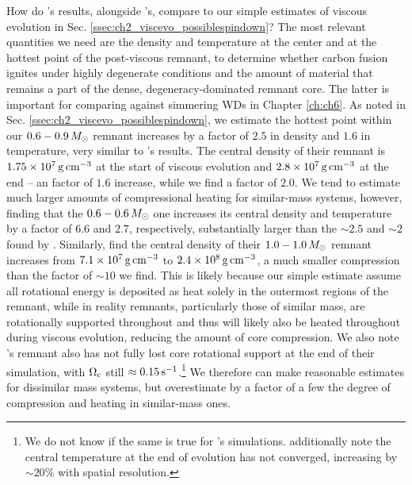 How do \cite{ji+13}'s results, alongside \cite{schw+12}'s, compare to our simple estimates of viscous evolution in Sec. \ref{ssec:ch2_viscevo_possiblespindown}?  The most relevant quantities we need are the density and temperature at the center and at the hottest point of the post-viscous remnant, to determine whether carbon fusion ignites under highly degenerate conditions and the amount of material that remains a part of the dense, degeneracy-dominated remnant core.  The latter is important for comparing against simmering WDs in Chapter \ref{ch:ch6}.  As noted in Sec. \ref{ssec:ch2_viscevo_possiblespindown}, we estimate the hottest point within our $0.6-0.9\,\Msun$ remnant increases by a factor of $2.5$ in density and $1.6$ in temperature, very similar to \cite{schw+12}'s results.  The central density of their remnant is $1.75\times10^7\,\gcc$ at the start of viscous evolution \citep{dan+11} and $2.8\times10^7\,\gcc$ at the end -- an factor of $1.6$ increase, while we find a factor of $2.0$.  We tend to estimate much larger amounts of compressional heating for similar-mass systems, however, finding that the $0.6 - 0.6\,\Msun$ one increases its central density and temperature by a factor of $6.6$ and $2.7$, respectively, substantially larger than the $\sim2.5$ and $\sim2$ found by \cite{ji+13}.  Similarly, \cite{rask+14} find the central density of their $1.0-1.0\,\Msun$ remnant increases from $7.1\times10^7\,\gcc$ to $2.4\times10^8\,\gcc$, a much smaller compression than the factor of $\sim10$ we find.  This is likely because our simple estimate assume all rotational energy is deposited as heat solely in the outermost regions of the remnant, while in reality remnants, particularly those of similar mass, are rotationally supported throughout and thus will likely also be heated throughout during viscous evolution, reducing the amount of core compression.  We also note \cite{ji+13}'s remnant also has not fully lost core rotational support at the end of their simulation, with $\Omegac$ still $\approx 0.15\,\psec$.\footnote{We do not know if the same is true for \cite{rask+14}'s simulations.  \cite{ji+13} additionally note the central temperature at the end of evolution has not converged, increasing by $\sim20$\% with spatial resolution.}  We therefore can make reasonable estimates for dissimilar mass systems, but overestimate by a factor of a few the degree of compression and heating in similar-mass ones.


